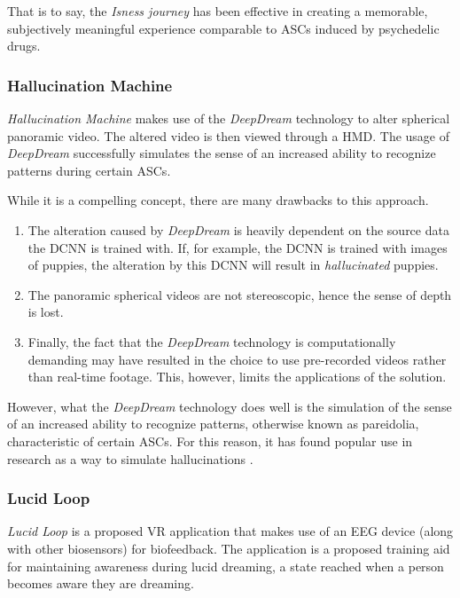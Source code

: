 That is to say, the \textit{Isness journey} has been effective in creating a memorable, subjectively meaningful experience comparable to \acp{ASC} induced by psychedelic drugs.

\subsubsection{Hallucination Machine}\label{sec:hallucination_machine}
\textit{Hallucination Machine} \autocite{suzuki2018hallucination} makes use of the \textit{DeepDream} \autocite{mordvintsev2015inceptionism} technology to alter spherical panoramic video. The altered video is then viewed through a \ac{HMD}. The usage of \textit{DeepDream} successfully simulates the sense of an increased ability to recognize patterns during certain \acp{ASC}.

While it is a compelling concept, there are many drawbacks to this approach.

\begin{enumerate}
    \item The alteration caused by \textit{DeepDream} is heavily dependent on the source data the \ac{DCNN} is trained with. If, for example, the \ac{DCNN} is trained with images of puppies, the alteration by this \ac{DCNN} will result in \textit{hallucinated} puppies.
    \item The panoramic spherical videos are not stereoscopic, hence the sense of depth is lost.
    \item Finally, the fact that the \textit{DeepDream} technology is computationally demanding may have resulted in the choice to use pre-recorded videos rather than real-time footage. This, however, limits the applications of the solution.
\end{enumerate}

However, what the \textit{DeepDream} technology does well is the simulation of the sense of an increased ability to recognize patterns, otherwise known as pareidolia, characteristic of certain \acp{ASC}. For this reason, it has found popular use in research as a way to simulate hallucinations \autocites{greco2021increased}{rastelli2021simulated}.

\subsubsection{Lucid Loop}
\textit{Lucid Loop} \autocite{kitson2019lucid} is a proposed \ac{VR} application that makes use of an \ac{EEG} device (along with other biosensors) for biofeedback. The application is a proposed training aid for maintaining awareness during lucid dreaming, a state reached when a person becomes aware they are dreaming.

